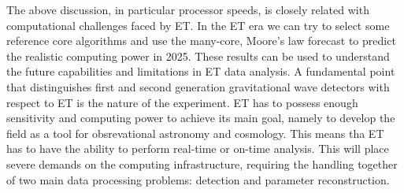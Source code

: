 



The above discussion, in particular processor speeds, is closely related with 
computational challenges faced by ET. In the ET era we can try to select some 
reference core algorithms and use the many-core, Moore's law forecast 
to predict the realistic computing power in 2025. These results can be 
used to understand the future capabilities and limitations in ET data analysis.
A fundamental point that distinguishes first and second generation gravitational 
wave detectors  with respect to ET is the nature of the experiment. ET has 
to possess enough sensitivity and computing power to achieve its main goal, 
namely to develop the field as a tool for obsrevational astronomy and cosmology. 
This means tha ET has to have the ability to perform real-time or on-time 
analysis. This will place severe demands on the computing infrastructure, 
requiring the handling together of two main data processing problems: 
detection and parameter reconstruction.

